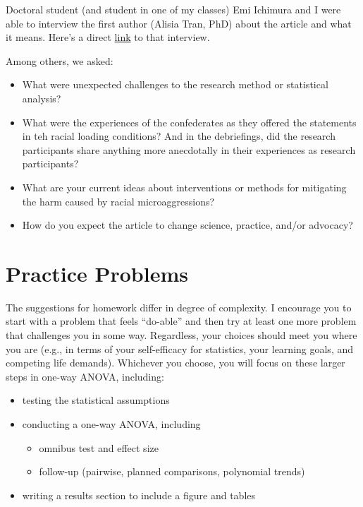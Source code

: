 \documentclass[
  11pt,
]{book}
\providecommand{\tightlist}{%
  \setlength{\itemsep}{0pt}\setlength{\parskip}{0pt}}
\begin{document}
Doctoral student (and student in one of my classes) Emi Ichimura and I were able to interview the first author (Alisia Tran, PhD) about the article and what it means. Here's a direct \href{https://spu.hosted.panopto.com/Panopto/Pages/Viewer.aspx?id=643f8a1e-bb6d-4ceb-a860-aeba01522528}{link} to that interview.

Among others, we asked:

\begin{itemize}
\tightlist
\item
  What were unexpected challenges to the research method or statistical analysis?
\item
  What were the experiences of the confederates as they offered the statements in teh racial loading conditions? And in the debriefings, did the research participants share anything more anecdotally in their experiences as research participants?
\item
  What are your current ideas about interventions or methods for mitigating the harm caused by racial microaggressions?
\item
  How do you expect the article to change science, practice, and/or advocacy?
\end{itemize}

\hypertarget{practice-problems-5}{%
\section{Practice Problems}\label{practice-problems-5}}

The suggestions for homework differ in degree of complexity. I encourage you to start with a problem that feels ``do-able'' and then try at least one more problem that challenges you in some way. Regardless, your choices should meet you where you are (e.g., in terms of your self-efficacy for statistics, your learning goals, and competing life demands). Whichever you choose, you will focus on these larger steps in one-way ANOVA, including:

\begin{itemize}
\tightlist
\item
  testing the statistical assumptions
\item
  conducting a one-way ANOVA, including

  \begin{itemize}
  \tightlist
  \item
    omnibus test and effect size
  \item
    follow-up (pairwise, planned comparisons, polynomial trends)
  \end{itemize}
\item
  writing a results section to include a figure and tables
\end{itemize}
\end{document}
